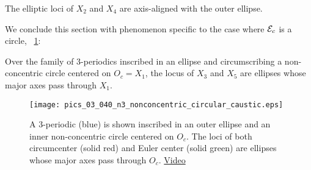  
\begin{observation}\label{obs:X2X4}
The elliptic loci of $X_2$ and $X_4$ are axis-aligned with the outer ellipse.
\end{observation} 

We conclude this section with phenomenon specific to the case where $\mathcal{E}_c$ is a circle,  ~\cref{fig:circular-caustic}:

\begin{observation}
 Over the family of 3-periodics inscribed in an ellipse and circumscribing a non-concentric circle centered on $O_c=X_1$, the locus of $X_3$ and $X_5$ are ellipses whose major axes pass through $X_1$.
 \end{observation}
 
\begin{figure}
    \centering
    \texttt{[image: pics\_03\_040\_n3\_nonconcentric\_circular\_caustic.eps]}
    \caption{A 3-periodic (blue) is shown inscribed in an outer ellipse and an inner non-concentric circle centered on $O_c$. The loci of both circumcenter (solid red) and Euler center (solid green) are ellipses whose major axes pass through $O_c$. \href{https://youtu.be/w7sZ5O8k4xU}{Video}}
    \label{fig:circular-caustic}
\end{figure}


